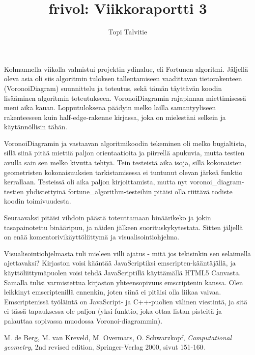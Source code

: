 \documentclass[a4paper, 11pt, finnish]{article}
\author{Topi Talvitie}
\title{frivol: Viikkoraportti 3}
\begin{document}
\maketitle

Kolmannella viikolla valmistui projektin ydinalue, eli Fortunen algoritmi. Jäljellä oleva asia oli siis algoritmin tuloksen tallentamiseen vaadittavan tietorakenteen (VoronoiDiagram) suunnittelu ja toteutus, sekä tämän täyttävän koodin lisääminen algoritmin toteutukseen. VoronoiDiagramin rajapinnan miettimisessä meni aika kauan. Lopputuloksena päädyin melko lailla samantyyliseen rakenteeseen kuin half-edge-rakenne kirjassa\cite{compgeomkirja}, joka on mielestäni selkein ja käytännöllisin tähän.

VoronoiDiagramin ja vastaavan algoritmikoodin tekeminen oli melko bugialtista, sillä siinä pitää miettiä paljon orientaatioita ja piirrellä apukuvia, mutta testien avulla sain sen melko kivutta tehtyä. Tein testeistä aika isoja, sillä kokonaisten geometristen kokonaisuuksien tarkistamisessa ei tuntunut olevan järkeä funktio kerrallaan. Testeissä oli aika paljon kirjoittamista, mutta nyt voronoi\_diagram-testien yhdistettyinä fortune\_algorithm-testeihin pitäisi olla riittävä todiste koodin toimivuudesta.

Seuraavaksi pitäisi vihdoin päästä toteuttamaan binäärikeko ja jokin tasapainotettu binääripuu, ja näiden jälkeen suorituskykytestata. Sitten jäljellä on enää komentorivikäyttöliittymä ja visualisointiohjelma. 

Visualisointiohjelmasta tuli mieleen villi ajatus - mitä jos tekisinkin sen selaimella ajettavaksi? Kirjaston voisi kääntää JavaScriptiksi emscripten-kääntäjällä, ja käyttöliittymäpuolen voisi tehdä JavaScriptillä käyttämällä HTML5 Canvasta. Samalla tulisi varmistettua kirjaston yhteensopivuus emscriptenin kanssa. Olen leikkinyt emscriptenillä ennenkin, joten siinä ei pitäisi olla liikaa vaivaa. Emscriptenissä työläintä on JavaScript- ja C++-puolien välinen viestintä, ja sitä ei tässä tapauksessa ole paljon (yksi funktio, joka ottaa listan pisteitä ja palauttaa sopivassa muodossa Voronoi-diagrammin).

\begin{thebibliography}{9}
 M. de Berg, M. van Kreveld, M. Overmars, O. Schwarzkopf, \emph{Computational geometry}, 2nd revised edition, Springer-Verlag 2000, sivut 151-160.
\end{thebibliography}
\end{document}
